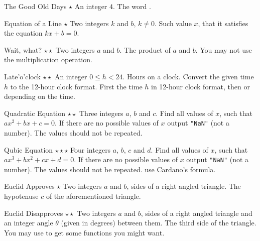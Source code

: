 \begin{task}{The Good Old Days $\star$}
\In
An integer $4$.
\Out
The word .
\end{task}

\begin{task}{Equation of a Line $\star$}
\In
Two integers $k$ and $b$, $k \neq 0$.
\Out
Such value $x$, that it satisfies the equation $kx+b=0$. 
\end{task}

\begin{task}{Wait, what? $\star\star$}
\In
Two integers $a$ and $b$.
\Out
The product of $a$ and $b$.
\Note
You may not use the multiplication operation.
\end{task}

\begin{task}{Late'o'clock $\star\star$}
\In An integer $0 \leq h < 24$. Hours on a clock.
\Note Convert the given time $h$ to the 12-hour clock format.
\Out First the time $h$ in 12-hour clock format, then  or 
depending on the time.
\end{task}

\begin{task}{Quadratic Equation $\star\star$}
\In
Three integers $a$, $b$ and $c$.
\Out
Find all values of $x$, such that $ax^2 + bx + c=0$. 
\Note
If there are no possible values of $x$ output \texttt{"NaN"} (not a number). 
The values should not be repeated.
\end{task}

\begin{task}{Qubic Equation $\star\star\star$}
\In
Four integers $a$, $b$, $c$ and $d$.
\Out
Find all values of $x$, such that $ax^3 + bx^2 + cx + d = 0$. 
\Note
If there are no possible values of $x$ output \texttt{"NaN"} (not a number). 
The values should not be repeated.
\Hint
use Cardano's formula.
\end{task}

\begin{task}{Euclid Approves $\star$}
\In
Two integers $a$ and $b$, sides of a right angled triangle.
\Out
The hypotenuse $c$ of the aforementioned triangle.
\end{task}

\begin{task}{Euclid Disapproves $\star\star$}
\In
Two integers $a$ and $b$, sides of a right angled triangle and an integer angle
$\theta$ (given in degrees) between them.
\Out
The third side of the triangle.
\Hint
You may use  to get some functions you might want.
\end{task}

